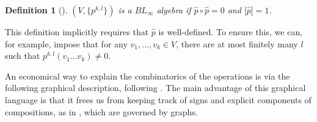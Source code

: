 \documentclass[11pt]{amsart}
\numberwithin{equation}{section}
\newtheorem{definition}[theorem]{\textbf{Definition}}
\begin{document}
\begin{definition}[{\cite[Definition 2.3]{moreno2024landscape}}]\label{def:BL}
$(V,\{p^{k,l}\})$ is a $BL_\infty$ algebra if $\widehat{p}\circ \widehat{p}=0$ and $|\widehat{p}|=1$.
\end{definition}
This definition implicitly requires that $\widehat{p}$ is well-defined. To ensure this, we can, for example, impose that for any $v_1,\ldots,v_k\in V$, there are at most finitely many $l$ such that $p^{k,l}(v_1\ldots v_k)\ne 0$.

An economical way to explain the combinatorics of the operations is via the following graphical description, following \cite{moreno2024landscape,moreno2024rsft}. The main advantage of this graphical language is that it frees us from keeping track of signs and explicit components of compositions, as in , which are governed by graphs.
\end{document}
